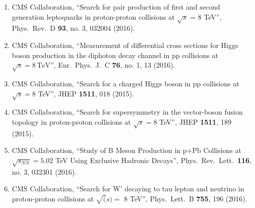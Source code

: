 \begin{enumerate}
\item CMS Collaboration, ``Search for pair production of first and second generation leptoquarks in proton-proton collisions at $\sqrt{s}$ = 8 TeV'', Phys.\ Rev.\ D {\bf 93}, no. 3, 032004 (2016).

\item CMS Collaboration, ``Measurement of differential cross sections for Higgs boson production in the diphoton decay channel in pp collisions at $\sqrt{s}=8\,\text {TeV} $'', Eur.\ Phys.\ J.\ C {\bf 76}, no. 1, 13 (2016).

\item CMS Collaboration, ``Search for a charged Higgs boson in pp collisions at $ \sqrt{s}=8 $ TeV'', JHEP {\bf 1511}, 018 (2015).

\item CMS Collaboration, ``Search for supersymmetry in the vector-boson fusion topology in proton-proton collisions at $ \sqrt{s}=8 $ TeV'', JHEP {\bf 1511}, 189 (2015).

\item CMS Collaboration, ``Study of B Meson Production in p$+$Pb Collisions at $\sqrt{s_{NN}}=5.02$ TeV Using Exclusive Hadronic Decays'', Phys.\ Rev.\ Lett.\  {\bf 116}, no. 3, 032301 (2016).

\item CMS Collaboration, ``Search for W' decaying to tau lepton and neutrino in proton-proton collisions at $\sqrt(s) =$ 8 TeV'', Phys.\ Lett.\ B {\bf 755}, 196 (2016).


\end{enumerate}
